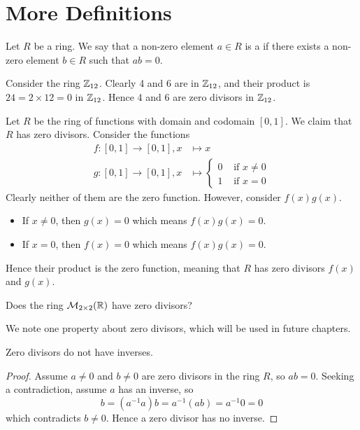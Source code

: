\section{More Definitions}\label{section-rings-more-definitions}
\begin{definition}
    Let $R$ be a ring. We say that a non-zero element $a \in R$ is a  if there exists a non-zero element $b \in R$ such that $ab = 0$.
\end{definition}
\begin{example}
    Consider the ring $\mathbb{Z}_{12}$. Clearly 4 and 6 are in $\mathbb{Z}_{12}$, and their product is $24 = 2 \times 12 = 0$ in $\mathbb{Z}_{12}$. Hence 4 and 6 are zero divisors in $\mathbb{Z}_{12}$.
\end{example}
\begin{example}
    Let $R$ be the ring of functions with domain and codomain $[0, 1]$. We claim that $R$ has zero divisors. Consider the functions
    \begin{align*}
        f:[0,1]\to[0,1], x &\mapsto x\\
        g:[0,1]\to[0,1], x &\mapsto \begin{cases}
            0 & \text{ if } x \neq 0\\
            1 & \text{ if } x = 0
        \end{cases}
    \end{align*}
    Clearly neither of them are the zero function. However, consider $f(x)g(x)$.
    \begin{itemize}
        \item If $x \neq 0$, then $g(x) = 0$ which means $f(x)g(x) = 0$.
        \item If $x = 0$, then $f(x) = 0$ which means $f(x)g(x) = 0$.
    \end{itemize}
    Hence their product is the zero function, meaning that $R$ has zero divisors $f(x)$ and $g(x)$.
\end{example}
\begin{exercise}
    Does the ring $\mathcal{M}_{2\times2}(\mathbb{R})$ have zero divisors?
\end{exercise}

We note one property about zero divisors, which will be used in future chapters.

\begin{proposition}\label{prop-zero-divisors-have-no-inverses}
    Zero divisors do not have inverses.
\end{proposition}
\begin{proof}
    Assume $a \neq 0$ and $b \neq 0$ are zero divisors in the ring $R$, so $ab = 0$. Seeking a contradiction, assume $a$ has an inverse, so
    \[
        b = (a^{-1}a)b = a^{-1}(ab) = a^{-1}0 = 0
    \]
    which contradicts $b \neq 0$. Hence a zero divisor has no inverse.
\end{proof}

